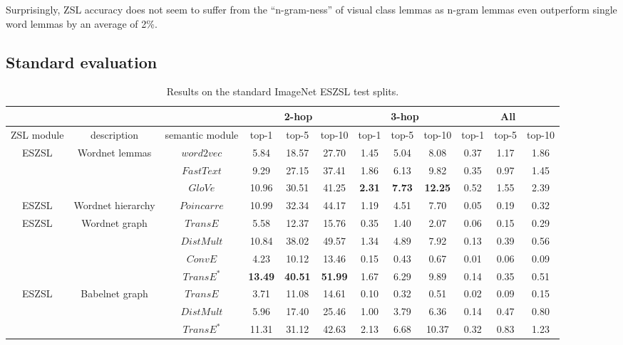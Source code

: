 Surprisingly, ZSL accuracy does not seem to suffer from the ``n-gram-ness'' of visual class lemmas as n-gram lemmas even outperform single word lemmas by an average of 2\%.

\subsection{Standard evaluation}
\begin{table*}[t]
\centering
\caption{Results on the standard ImageNet ESZSL test splits.}
\begin{tabular}{c c c c c c c c c c c c }
&&&\multicolumn{3}{c}{2-hop}&\multicolumn{3}{c}{3-hop}&\multicolumn{3}{c}{All} \\
\hline
ZSL module & description & semantic module & top-1 & top-5 & top-10  & top-1 & top-5 & top-10 & top-1 & top-5 & top-10\\
\hline		
\multirow{3}{*}{ESZSL} & \multirow{3}{*}{Wordnet lemmas} & $word2vec$   & 5.84   & 18.57  &  27.70  &  1.45  &  5.04  &  8.08  &  0.37  & 1.17  &  1.86 \\
 &  & $FastText$  & 9.29  & 27.15 &  37.41  &  1.86  &  6.13  &  9.82   &  0.35  &  0.97 &  1.45 \\
 &  & $GloVe$     & 10.96 & 30.51 &  41.25  &  \textbf{2.31}  &  \textbf{7.73}  &  \textbf{12.25}  &  0.52  & 1.55  &  2.39\\
\hline	
ESZSL & Wordnet hierarchy & $Poincarre$ & 10.99  & 32.34  &  44.17 &  1.19  &  4.51  &  7.70  &  0.05  & 0.19  & 0.32\\
\hline
\multirow{4}{*}{ESZSL} & \multirow{4}{*}{Wordnet graph} & $TransE$   & 5.58  & 12.37  &  15.76  &  0.35  & 1.40  &  2.07  &  0.06  &  0.15  &  0.29 \\
&  &$DistMult$           & 10.84 &  38.02  &  49.57  &  1.34  &  4.89  &  7.92  &  0.13  &  0.39  &  0.56 \\
&  &$ConvE$              & 4.23  &  10.12  &  13.46  &  0.15  &  0.43  &  0.67  &  0.01  &  0.06  &  0.09  \\
&  &$TransE^{*}$         & \textbf{13.49} &  \textbf{40.51}  &  \textbf{51.99}  &  1.67  &  6.29  &  9.89  &  0.14  &  0.35  & 0.51  \\
\hline	
\multirow{3}{*}{ESZSL}& \multirow{3}{*}{Babelnet graph} &$TransE$   &  3.71 &  11.08 & 14.61  & 0.10  & 0.32  &  0.51  &  0.02  & 0.09  &  0.15\\
&  &$DistMult$          & 5.96   & 17.40  &  25.46 & 1.00  &  3.79 &  6.36  &  0.14  & 0.47  &  0.80 \\
&  &$TransE^{*}$              & 11.31  & 31.12  &  42.63 & 2.13  &  6.68 &  10.37 &  0.32  & 0.83  &  1.23 \\

\end{tabular}
\end{table*}
